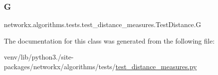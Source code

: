 \subsubsection{\texorpdfstring{G}{G}}
{\footnotesize\ttfamily networkx.\+algorithms.\+tests.\+test\+\_\+distance\+\_\+measures.\+Test\+Distance.\+G}



The documentation for this class was generated from the following file\+:\begin{DoxyCompactItemize}
\item 
venv/lib/python3./site-\/packages/networkx/algorithms/tests/\hyperlink{tests_2test__distance__measures_8py}{test\+\_\+distance\+\_\+measures.\+py}\end{DoxyCompactItemize}
